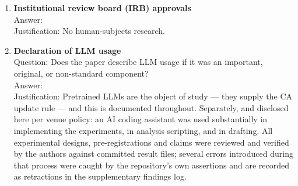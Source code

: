 \begin{enumerate}
\item {\bf Institutional review board (IRB) approvals} \\
Answer: \answerNA{} \\
Justification: No human-subjects research.

\item {\bf Declaration of LLM usage} \\
Question: Does the paper describe LLM usage if it was an important, original, or non-standard component? \\
Answer: \answerYes{} \\
Justification: Pretrained LLMs are the object of study --- they supply the CA update rule --- and this is documented throughout. Separately, and disclosed here per venue policy: an AI coding assistant was used substantially in implementing the experiments, in analysis scripting, and in drafting. All experimental designs, pre-registrations and claims were reviewed and verified by the authors against committed result files; several errors introduced during that process were caught by the repository's own assertions and are recorded as retractions in the supplementary findings log.
\end{enumerate}
